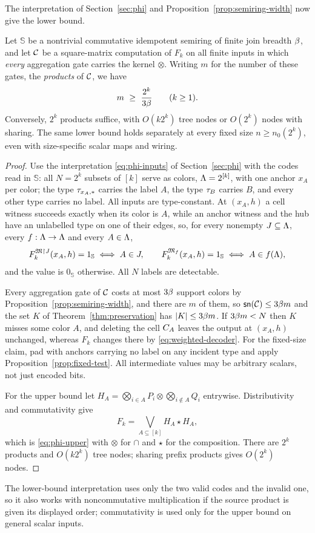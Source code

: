 The interpretation of Section~\ref{sec:phi} and Proposition~\ref{prop:semiring-width}
now give the lower bound.
\begin{theorem}\label{thm:weighted}
Let $\mathbb S$ be a nontrivial commutative idempotent semiring of finite
join breadth $\beta$, and let $\mathcal C$ be a square-matrix computation of
$F_k$ on all finite inputs in which \emph{every} aggregation gate carries
the kernel $\otimes$. Writing $m$ for the number of these gates, the
\emph{products} of $\mathcal C$, we have
\[
 m\ \ge\ \frac{2^k}{3\breadth}\qquad(k\ge1).
\]
Conversely, $2^k$ products suffice, with $O(k2^k)$ tree nodes or $O(2^k)$
nodes with sharing. The same lower bound holds separately at every fixed
size $n\ge n_0(2^k)$, even with size-specific scalar maps and wiring.
\end{theorem}
\begin{proof}
Use the interpretation \eqref{eq:phi-inputs} of Section~\ref{sec:phi} with
the codes read in $\mathbb S$: all $N=2^k$ subsets of $[k]$ serve as colors,
$\Lambda=2^{[k]}$, with one anchor $x_A$ per color; the type $\tau_{x_A,\ast}$
carries the label $A$, the type $\tau_{B}$ carries $B$, and every other type
carries no label. All inputs are type-constant. At $(x_A,h)$ a cell witness
succeeds exactly when its color is $A$, while an anchor witness and the hub
have an unlabelled type on one of their edges, so, for every nonempty
$J\subseteq\Lambda$, every $f:\Lambda\to\Lambda$ and every $A\in\Lambda$,
\begin{equation}\label{eq:weighted-decoder}
 F_k^{\mathfrak M\mathord{\restriction} J}(x_A,h)=1_{\mathbb S}\iff A\in J,\qquad
 F_k^{\mathfrak M_f}(x_A,h)=1_{\mathbb S}\iff A\in f(\Lambda),
\end{equation}
and the value is $0_{\mathbb S}$ otherwise. All $N$ labels are detectable.

Every aggregation gate of $\mathcal C$ costs at most $3\beta$ support colors
by Proposition~\ref{prop:semiring-width}, and there are $m$ of them, so
$\mathsf{sn}(\mathcal C)\le3\beta m$ and the set $K$ of
Theorem~\ref{thm:preservation} has $|K|\le3\beta m$. If $3\beta m<N$
then $K$ misses some color $A$, and deleting the cell $C_{A}$ leaves the
output at $(x_A,h)$ unchanged, whereas $F_k$ changes there by
\eqref{eq:weighted-decoder}. For the
fixed-size claim, pad with anchors carrying no label on any incident type
and apply Proposition~\ref{prop:fixed-test}. All
intermediate values may be arbitrary scalars, not just encoded bits.

For the upper bound let
$H_A=\bigotimes_{i\in A}P_i\otimes\bigotimes_{i\notin A}Q_i$ entrywise.
Distributivity and commutativity give
\begin{equation}\label{eq:weighted-upper}
 F_k=\bigvee_{A\subseteq[k]}H_A\star H_A,
\end{equation}
which is \eqref{eq:phi-upper} with $\otimes$ for $\cap$ and $\star$ for the
composition. There are $2^k$ products and $O(k2^k)$ tree nodes; sharing
prefix products gives $O(2^k)$ nodes.
\end{proof}
The lower-bound interpretation uses only the two valid codes and the invalid
one, so it also works with noncommutative multiplication if the source
product is given its displayed order; commutativity is used only for the
upper bound on general scalar inputs.

